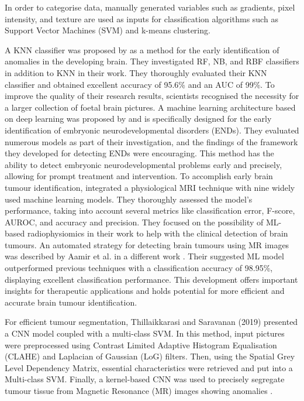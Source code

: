 \documentclass[12pt, a4paper,twoside]{report}
\theoremstyle{plain} %
\theoremstyle{definition} %
\theoremstyle{remark} %
\numberwithin{equation}{chapter}
\begin{document}
In order to categorise data, manually generated variables such as gradients, pixel intensity, and texture are used as inputs for classification algorithms such as Support Vector Machines (SVM) and k-means clustering.

A KNN classifier was proposed by \cite{lotlikar22} as a method for the early identification of anomalies in the developing brain. They investigated RF, NB, and RBF classifiers in addition to KNN in their work. They thoroughly evaluated their KNN classifier and obtained excellent accuracy of 95.6\% and an AUC of 99\%. To improve the quality of their research results, scientists recognised the necessity for a larger collection of foetal brain pictures. A machine learning architecture based on deep learning was proposed by \cite{attallah20} and is specifically designed for the early identification of embryonic neurodevelopmental disorders (ENDs). They evaluated numerous models as part of their investigation, and the findings of the framework they developed for detecting ENDs were encouraging. This method has the ability to detect embryonic neurodevelopmental problems early and precisely, allowing for prompt treatment and intervention. To accomplish early brain tumour identification, \cite{stadlbauer22} integrated a physiological MRI technique with nine widely used machine learning models. They thoroughly assessed the model's performance, taking into account several metrics like classification error, F-score, AUROC, and accuracy and precision. They focused on the possibility of ML-based radiophysiomics in their work to help with the clinical detection of brain tumours. An automated strategy for detecting brain tumours using MR images was described by Aamir et al. in a different work \cite{aamir22}. Their suggested ML model outperformed previous techniques with a classification accuracy of 98.95\%, displaying excellent classification performance. This development offers important insights for therapeutic applications and holds potential for more efficient and accurate brain tumour identification.

For efficient tumour segmentation, Thillaikkarasi and Saravanan (2019) presented a CNN model coupled with a multi-class SVM. In this method, input pictures were preprocessed using Contrast Limited Adaptive Histogram Equalisation (CLAHE) and Laplacian of Gaussian (LoG) filters. Then, using the Spatial Grey Level Dependency Matrix, essential characteristics were retrieved and put into a Multi-class SVM. Finally, a kernel-based CNN was used to precisely segregate tumour tissue from Magnetic Resonance (MR) images showing anomalies \cite{thillaikkarasi2019enhancement}.
\end{document}
